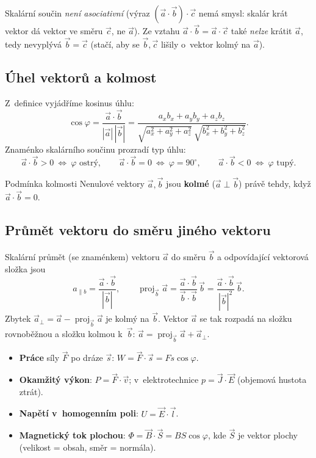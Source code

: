 \documentclass[a4paper,11pt]{article}
\newcommand{\abs}[1]{\left\lvert #1\right\rvert}
\DeclareMathOperator{\proj}{proj}
\begin{document}
\begin{pozor}
Skalární součin \emph{není asociativní} (výraz $(\vec a\cdot\vec b)\cdot\vec c$ nemá smysl:
skalár krát vektor dá vektor ve směru $\vec c$, ne $\vec a$). Ze vztahu
$\vec a\cdot\vec b=\vec a\cdot\vec c$ také \emph{nelze} krátit $\vec a$, tedy nevyplývá
$\vec b=\vec c$ (stačí, aby se $\vec b,\vec c$ lišily o~vektor kolmý na $\vec a$).
\end{pozor}

\subsection{Úhel vektorů a kolmost}

Z~definice vyjádříme kosinus úhlu:
\begin{equation}
  \cos\varphi=\frac{\vec a\cdot\vec b}{\abs{\vec a}\,\abs{\vec b}}
  =\frac{a_xb_x+a_yb_y+a_zb_z}{\sqrt{a_x^2+a_y^2+a_z^2}\ \sqrt{b_x^2+b_y^2+b_z^2}} .
\end{equation}
Znaménko skalárního součinu prozradí typ úhlu:
\[
  \vec a\cdot\vec b>0\ \Leftrightarrow\ \varphi\text{ ostrý},\qquad
  \vec a\cdot\vec b=0\ \Leftrightarrow\ \varphi=90^\circ,\qquad
  \vec a\cdot\vec b<0\ \Leftrightarrow\ \varphi\text{ tupý}.
\]

\begin{veta}{Podmínka kolmosti}
Nenulové vektory $\vec a,\vec b$ jsou \textbf{kolmé} ($\vec a\perp\vec b$) právě tehdy, když
$\vec a\cdot\vec b=0$.
\end{veta}

\subsection{Průmět vektoru do směru jiného vektoru}

Skalární průmět (se znaménkem) vektoru $\vec a$ do směru $\vec b$ a odpovídající
vektorová složka jsou
\begin{equation}
  a_{\parallel b}=\frac{\vec a\cdot\vec b}{\abs{\vec b}},\qquad
  \proj_{\vec b}\vec a=\frac{\vec a\cdot\vec b}{\vec b\cdot\vec b}\,\vec b
  =\frac{\vec a\cdot\vec b}{\abs{\vec b}^{2}}\,\vec b .
\end{equation}
Zbytek $\vec a_\perp=\vec a-\proj_{\vec b}\vec a$ je kolmý na $\vec b$.
Vektor $\vec a$ se tak rozpadá na složku rovnoběžnou a složku kolmou k~$\vec b$:
$\vec a=\proj_{\vec b}\vec a+\vec a_\perp$.

\begin{ekt}
\begin{itemize}
  \item \textbf{Práce} síly $\vec F$ po dráze $\vec s$: $W=\vec F\cdot\vec s=Fs\cos\varphi$.
  \item \textbf{Okamžitý výkon}: $P=\vec F\cdot\vec v$; v~elektrotechnice
        $p=\vec J\cdot\vec E$ (objemová hustota ztrát).
  \item \textbf{Napětí v~homogenním poli}: $U=\vec E\cdot\vec l$.
  \item \textbf{Magnetický tok plochou}: $\Phi=\vec B\cdot\vec S=BS\cos\varphi$, kde $\vec S$ je
        vektor plochy (velikost = obsah, směr = normála).
\end{itemize}
\end{ekt}
\end{document}
